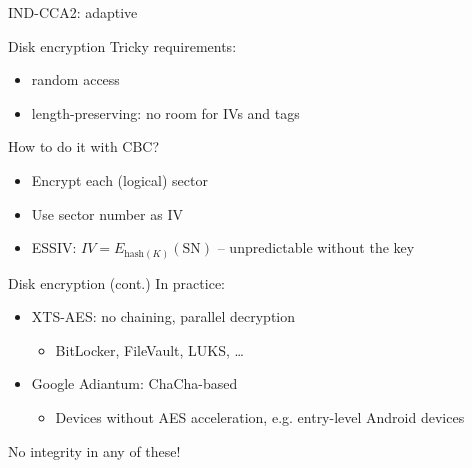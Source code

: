\begin{frame}{IND-CCA2: adaptive}
\begin{figure}
  \end{figure}
\end{frame}

\begin{frame}{Disk encryption}
  Tricky requirements:
  \begin{itemize}[<+(1)->]
    \item random access
    \item length-preserving: no room for IVs and tags
  \end{itemize}

  \vspace*{1em}

  \pause
  How to do it with CBC?
  \begin{itemize}[<+(1)->]
    \item Encrypt each (logical) sector
    \item Use sector number as IV
    \item ESSIV: $IV = E_{\mathrm{hash}(K)}(\mathrm{SN})$ -- unpredictable without the key
  \end{itemize}
\end{frame}

\begin{frame}{Disk encryption (cont.)}
  In practice:
  \begin{itemize}[<+(1)->]
    \item XTS-AES: no chaining, parallel decryption
    \begin{itemize}
      \item BitLocker, FileVault, LUKS, \dots
    \end{itemize}
    \item Google Adiantum: ChaCha-based
    \begin{itemize}
      \item Devices without AES acceleration, e.g. entry-level Android devices
    \end{itemize}
  \end{itemize}

  \vspace*{1em}

  \pause
  No integrity in any of these!
\end{frame}

